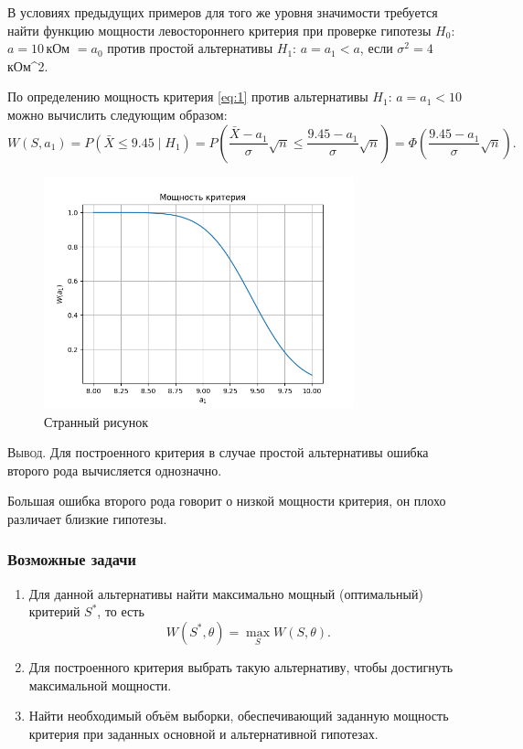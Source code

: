 \begin{ex}
	В условиях предыдущих примеров для того же уровня значимости требуется найти
	функцию мощности левостороннего критерия при проверке гипотезы $ H_0 $: $ a =
	10$\,кОм $ = a_0 $ против простой альтернативы $ H_1 $: $ a = a_1 < a $, если
	$ \sigma^2 = 4 $\,кОм^2.
\begin{solution}
	По определению мощность критерия \eqref{eq:1} против альтернативы $ H_1 $: $ a
	= a_1 < 10$ можно вычислить следующим образом: 
	\[
			W(S, a_1) = P(\bar X \leqslant 9.45\mid H_1) = P \left( \frac{\bar X -
			a_1}{\sigma} \sqrt n \leqslant \frac{9.45 - a_1}{\sigma} \sqrt n \right) =
			\Phi  \left( \frac{9.45 - a_1}{\sigma}\sqrt n \right).
	\]
	\begin{figure}[h!]
		\centering
		\includegraphics[width=0.8\textwidth]{Figures/W(a1).png}
    \caption{Странный рисунок}
		\label{fig:9-plot2}
	\end{figure}
\end{solution}
\end{ex}

\textsc{Вывод}.
Для построенного критерия в случае простой альтернативы ошибка второго рода 
вычисляется однозначно. 

 Большая ошибка второго рода говорит о низкой мощности критерия, он плохо различает 
близкие гипотезы. 

\subsubsection{Возможные задачи}
\begin{enumerate}
	\item Для данной альтернативы найти максимально мощный (оптимальный) критерий
		$ S^\ast $, то есть  
		\[
				W(S^\ast, \theta) = \max_S W(S,\theta).
		\]
	\item Для построенного критерия выбрать такую альтернативу, чтобы достигнуть
		максимальной мощности.
	\item Найти необходимый объём выборки, обеспечивающий заданную мощность
		критерия при заданных основной и альтернативной гипотезах.
\end{enumerate}



